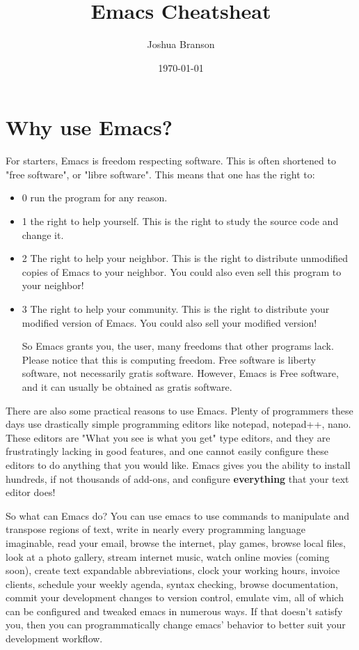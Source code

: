 \documentclass[11pt]{article}
\author{Joshua Branson}
\date{\today}
\title{Emacs Cheatsheat}
\begin{document}
\maketitle

\section{Why use Emacs?}
\label{sec:orgheadline1}

For starters, Emacs is freedom respecting software.  This is often shortened to "free software", or "libre software".  This means that one has the right to:
\begin{itemize}
\item 0 run the program for any reason.
\item 1 the right to help yourself.
This is the right to study the source code and change it.
\item 2 The right to help your neighbor.
This is the right to distribute unmodified copies of Emacs to your neighbor.  You could also even sell this program to your neighbor!
\item 3 The right to help your community.
This is the right to distribute your modified version of Emacs.  You could also sell your modified version!

So Emacs grants you, the user, many freedoms that other programs lack.  Please notice that this is computing freedom.  Free software is liberty software, not necessarily gratis software.  However,  Emacs is Free software, and it can usually be obtained as gratis software.
\end{itemize}

There are also some practical reasons to use Emacs. Plenty of programmers these days use drastically simple programming editors like notepad, notepad++, nano.  These editors are "What you see is what you get" type editors, and they are frustratingly lacking in good features, and one cannot easily configure these editors to do anything that you would like.  Emacs gives you the ability to install hundreds, if not thousands of add-ons, and configure \textbf{everything} that your text editor does!

So what can Emacs do?  You can use emacs to use commands to manipulate and transpose regions of text, write in nearly every programming language imaginable, read your email, browse the internet, play games, browse local files, look at a photo gallery, stream internet music, watch online movies (coming soon), create text expandable abbreviations, clock your working hours, invoice clients, schedule your weekly agenda, syntax checking, browse documentation, commit your development changes to version control, emulate vim, all of which can be configured and tweaked emacs in numerous ways.  If that doesn't satisfy you, then you can programmatically change emacs' behavior to better suit your development workflow.
\end{document}
